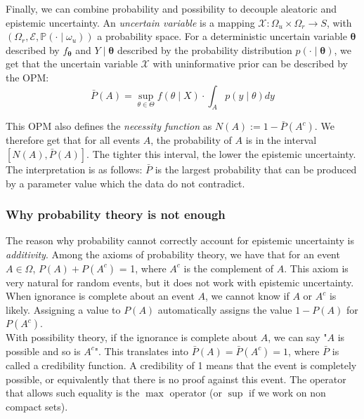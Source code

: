 \documentclass[12pt,a4paper]{article}
\theoremstyle{definition}
\theoremstyle{plain}
\newcommand{\fposs}{f_{\bm{\theta}}}
\newcommand{\Prob}{\mathbb{P}}
\newcommand{\Pbar}{\bar{{P}}}
\begin{document}
\noindent Finally, we can combine probability and possibility to decouple aleatoric and epistemic uncertainty. An \emph{uncertain variable} is a mapping $\mathcal{X} : \Omega_u \times \Omega_r \to S$, with $(\Omega_r, \mathcal{E}, \Prob(\cdot \mid \omega_u))$ a probability space. For a deterministic uncertain variable $\bm{\theta}$ described by $\fposs$ and $Y \mid \bm{\theta}$ described by the probability distribution $p(\cdot \mid \bm{\theta})$, we get that the uncertain variable $\mathcal{X}$ with uninformative prior can be described by the OPM:
$$
\bar{P}(A) = \sup_{\theta \in \Theta} f(\theta \mid X)  \cdot \int_A p(y \mid \theta) dy
$$

\noindent This OPM also defines the \emph{necessity function} as $N(A) := 1 - \bar{P}(A^c)$. We therefore get that for all events $A$, the probability of $A$ is in the interval $[N(A), \bar{P}(A)]$. The tighter this interval, the lower the epistemic uncertainty. The interpretation is as follows: $\Pbar$ is the largest probability that can be produced by a parameter value which the data do not contradict. 




\subsubsection{Why probability theory is not enough}

\noindent The reason why probability cannot correctly account for epistemic uncertainty is \emph{additivity}. Among the axioms of probability theory, we have that for an event $A \in \Omega$, $P(A) + P(A^c)$ = 1, where $A^c$ is the complement of $A$. This axiom is very natural for random events, but it does not work with epistemic uncertainty. When ignorance is complete about an event $A$, we cannot know if $A$ or $A^c$ is likely. Assigning a value to $P(A)$ automatically assigns the value $1 - P(A)$ for $P(A^c)$. \\

\noindent With possibility theory, if the ignorance is complete about $A$, we can say "$A$ is possible and so is $A^c$". This translates into $\bar{P}(A) = \bar{P}(A^c) = 1$, where $\bar{P}$ is called a credibility function. A credibility of 1 means that the event is completely possible, or equivalently that there is no proof against this event. The operator that allows such equality is the $\max$ operator (or $\sup$ if we work on non compact sets). \\
\end{document}
